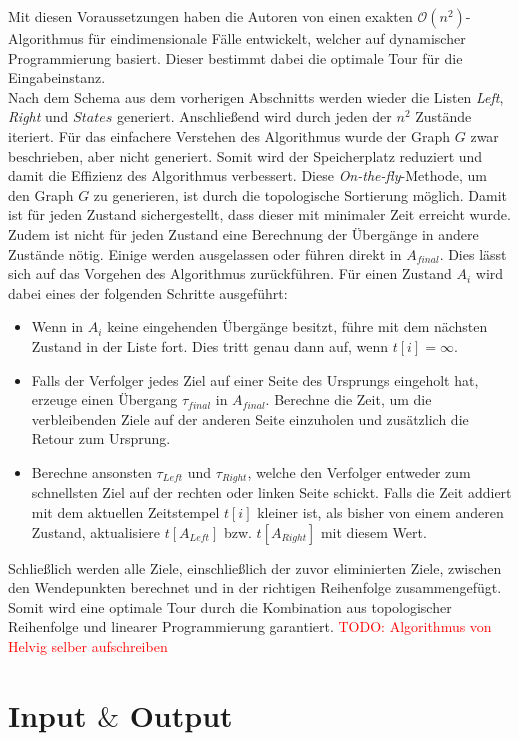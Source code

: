 \documentclass[german,version-2019-11]{uzl-thesis}
\begin{document}
Mit diesen Voraussetzungen haben die Autoren von \cite{helvig} einen exakten $\mathcal{O}(n^2)$-Algorithmus für eindimensionale Fälle entwickelt, welcher auf dynamischer Programmierung basiert. Dieser bestimmt dabei die optimale Tour für die Eingabeinstanz. \\
Nach dem Schema aus dem vorherigen Abschnitts werden wieder die Listen \emph{Left}, \emph{Right} und $States$ generiert. Anschließend wird durch jeden der $n^2$ Zustände iteriert. Für das einfachere Verstehen des Algorithmus wurde der Graph $G$ zwar beschrieben, aber nicht generiert. Somit wird der Speicherplatz reduziert und damit die Effizienz des Algorithmus verbessert. Diese \emph{On-the-fly}-Methode, um den Graph $G$ zu generieren, ist durch die topologische Sortierung möglich. Damit ist für jeden Zustand sichergestellt, dass dieser mit minimaler Zeit erreicht wurde. Zudem ist nicht für jeden Zustand eine Berechnung der Übergänge in andere Zustände nötig. Einige werden ausgelassen oder führen direkt in $A_{final}$. Dies lässt sich auf das Vorgehen des Algorithmus zurückführen. Für einen Zustand $A_i$ wird dabei eines der folgenden Schritte ausgeführt:
\begin{itemize}
\item Wenn in $A_i$ keine eingehenden Übergänge besitzt, führe mit dem nächsten Zustand in der Liste fort. Dies tritt genau dann auf, wenn $t[i] = \infty$.
\item Falls der Verfolger jedes Ziel auf einer Seite des Ursprungs eingeholt hat, erzeuge einen Übergang $\tau_{final}$ in $A_{final}$. Berechne die Zeit, um die verbleibenden Ziele auf der anderen Seite einzuholen und zusätzlich die Retour zum Ursprung. 
\item Berechne ansonsten $\tau_{Left}$ und $\tau_{Right}$, welche den Verfolger entweder zum schnellsten Ziel auf der rechten oder linken Seite schickt. Falls die Zeit addiert mit dem aktuellen Zeitstempel $t[i]$ kleiner ist, als bisher von einem anderen Zustand, aktualisiere $t[A_{Left}]$ bzw. $t[A_{Right}]$ mit diesem Wert.
\end{itemize}
Schließlich werden alle Ziele, einschließlich der zuvor eliminierten Ziele, zwischen den Wendepunkten berechnet und in der richtigen Reihenfolge zusammengefügt. Somit wird eine optimale Tour durch die Kombination aus topologischer Reihenfolge und linearer Programmierung garantiert.
\textcolor{red}{TODO: Algorithmus von Helvig selber aufschreiben}

\section{Input $\&$ Output}
\end{document}
